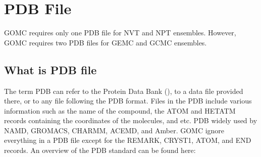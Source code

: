 \documentclass[letterpaper,10pt,english]{sphinxmanual}
\begin{document}
\section{PDB File}
\label{\detokenize{input_file:pdb-file}}
GOMC requires only one PDB file for NVT and NPT ensembles. However, GOMC requires two PDB files for GEMC and GCMC ensembles.


\subsection{What is PDB file}
\label{\detokenize{input_file:what-is-pdb-file}}
The term PDB can refer to the Protein Data Bank (), to a data file provided there, or to any file following the PDB format. Files in the PDB include various information such as the name of the compound, the ATOM and HETATM records containing the coordinates of the molecules, and etc. PDB widely used by NAMD, GROMACS, CHARMM, ACEMD, and Amber. GOMC ignore everything in a PDB file except for the REMARK, CRYST1, ATOM, and END records. An overview of the PDB standard can be found here:

\end{document}
